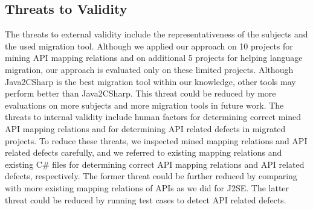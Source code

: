 \subsection{Threats to Validity}
\label{sec:evaluation:threats} The threats to external validity
include the representativeness of the subjects and
the used migration tool. Although we applied
our approach on 10 projects for mining API mapping relations and on additional
5 projects for helping language migration, our approach is
evaluated only on these limited projects. Although Java2CSharp is
the best migration tool within our knowledge, other tools may perform
better than Java2CSharp. This threat could be reduced by more
evaluations on more subjects and more migration tools in future
work. The threats to internal validity include human factors for
determining correct mined API mapping relations and for determining API related defects in
migrated projects. To reduce these threats, we inspected mined
mapping relations and API related defects carefully, and we referred to existing
mapping relations and existing C\# files for determining correct API
mapping relations and API related defects, respectively. The former threat could be further
reduced by comparing with more existing mapping relations of APIs as we did for
J2SE. The latter threat could be reduced by running test cases to detect API related defects.
